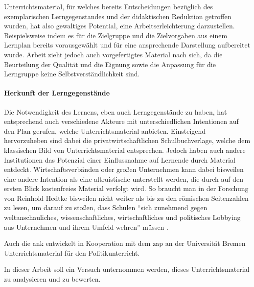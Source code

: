 Unterrichtsmaterial, für welches bereits Entscheidungen bezüglich des exemplarischen Lerngegenstandes und der didaktischen Reduktion getroffen wurden, hat also gewaltiges Potential, eine Arbeitserleichterung darzustellen.
Beispielsweise indem es für die Zielgruppe und die Zielvorgaben aus einem Lernplan bereits vorausgewählt und für eine ansprechende Darstellung aufbereitet wurde.
Arbeit zieht jedoch auch vorgefertigtes Material nach sich, da die Beurteilung der Qualität und die Eignung sowie die Anpassung für die Lerngruppe keine Selbstverständlichkeit sind.

\paragraph{Herkunft der Lerngegenstände}
Die Notwendigkeit des Lernens, eben auch Lerngegenstände zu haben, hat entsprechend auch verschiedene Akteure mit unterschiedlichen Intentionen auf den Plan gerufen, welche Unterrichtsmaterial anbieten.
Einsteigend hervorzuheben sind dabei die privatwirtschaftlichen Schulbuchverlage, welche dem klassischen Bild von Unterrichtsmaterial entsprechen. Jedoch haben auch andere Institutionen das Potenzial einer Einflussnahme auf Lernende durch 
Material entdeckt. Wirtschaftsverbänden oder großen Unternehmen kann dabei bisweilen eine andere Intention als eine altruistische unterstellt werden, die durch auf den ersten Blick kostenfreies Material verfolgt wird. So braucht man in der Forschung von Reinhold Hedtke bisweilen nicht weiter als bis zu den römischen Seitenzahlen zu lesen, um darauf zu stoßen, dass Schulen \enquote{sich zunehmend gegen weltanschauliches, wissenschaftliches, wirtschaftliches und politisches Lobbying aus Unternehmen und ihrem Umfeld wehren} müssen \autocite[i]{Hedtke2016}. 


Auch die \gls{ank} entwickelt in Kooperation mit dem \gls{zap} an der Universität Bremen Unterrichtsmaterial für den Politikunterricht.


In dieser Arbeit soll ein Versuch unternommen werden, dieses Unterrichtsmaterial zu analysieren und zu bewerten. %

